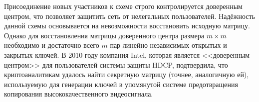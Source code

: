 Присоединение новых участников к схеме строго контролируется доверенным центром, что позволяет защитить сеть от нелегальных пользователей. Надёжность данной схемы основывается на невозможности восстановить исходную матрицу. Однако для восстановления матрицы доверенного центра размера $m \times m$ необходимо и достаточно всего $m$ пар линейно независимых открытых и закрытых ключей. В 2010 году компания Intel, которая является <<доверенным центром>> для пользователей системы защиты HDCP, подтвердила, что криптоаналитикам удалось найти секретную матрицу (точнее, аналогичную ей), используемую для генерации ключей в упомянутой системе предотвращения копирования высококачественного видеосигнала.
